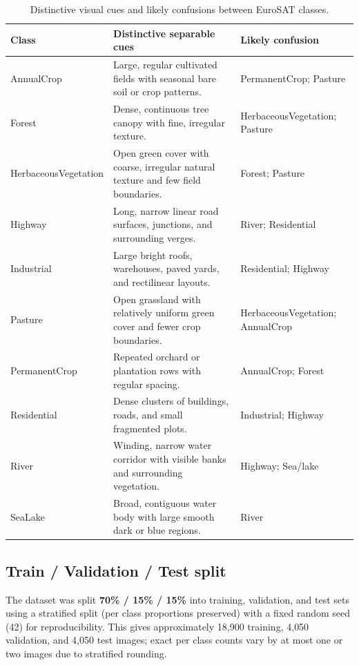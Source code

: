 \documentclass[11pt]{article}
\begin{document}
\begin{table}[H]
\centering
\caption{Distinctive visual cues and likely confusions between EuroSAT
classes.}
\label{tab:class-cues}
\small
\renewcommand{\arraystretch}{1.18}
\begin{tabular}{|p{1.35in}|p{2.55in}|p{2.25in}|}
\hline
\textbf{Class} & \textbf{Distinctive separable cues} & \textbf{Likely confusion} \\
\hline
AnnualCrop & Large, regular cultivated fields with seasonal bare soil or crop patterns. & PermanentCrop; Pasture \\
\hline
Forest & Dense, continuous tree canopy with fine, irregular texture. & HerbaceousVegetation; Pasture \\
\hline
HerbaceousVegetation & Open green cover with coarse, irregular natural texture and few field boundaries. & Forest; Pasture \\
\hline
Highway & Long, narrow linear road surfaces, junctions, and surrounding verges. & River; Residential \\
\hline
Industrial & Large bright roofs, warehouses, paved yards, and rectilinear layouts. & Residential; Highway \\
\hline
Pasture & Open grassland with relatively uniform green cover and fewer crop boundaries. & HerbaceousVegetation; AnnualCrop \\
\hline
PermanentCrop & Repeated orchard or plantation rows with regular spacing. & AnnualCrop; Forest \\
\hline
Residential & Dense clusters of buildings, roads, and small fragmented plots. & Industrial; Highway \\
\hline
River & Winding, narrow water corridor with visible banks and surrounding vegetation. & Highway; Sea/lake \\
\hline
SeaLake & Broad, contiguous water body with large smooth dark or blue regions. & River \\
\hline
\end{tabular}
\end{table}

\subsection{Train / Validation / Test split}
The dataset was split \textbf{70\% / 15\% / 15\%} into training, validation,
and test sets using a stratified split (per class proportions preserved) with
a fixed random seed (42) for reproducibility. This gives approximately
18{,}900 training, 4{,}050 validation, and 4{,}050 test images; exact
per class counts vary by at most one or two images due to stratified
rounding.
\end{document}
